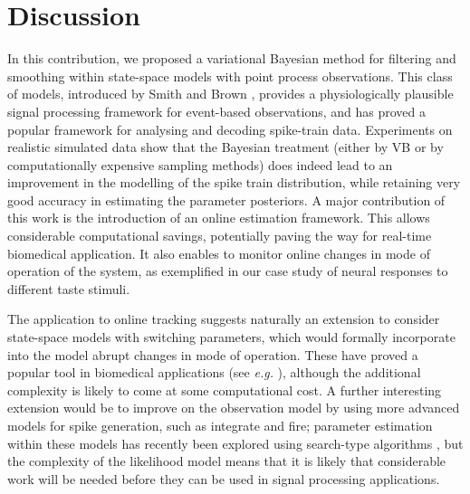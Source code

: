 \documentclass[12pt]{article}
\begin{document}
\section{Discussion}

In this contribution, we proposed a variational Bayesian method for filtering and smoothing within
state-space models with point process observations. This class of models, introduced by Smith and
Brown \cite{Smith_2003}, provides a physiologically plausible signal processing framework for
event-based observations, and has proved a popular framework for analysing and decoding spike-train
data. Experiments on realistic simulated data show that the Bayesian treatment (either by VB or by
computationally expensive sampling methods) does indeed lead to an improvement in the modelling of
the spike train distribution, while retaining very good accuracy in estimating the parameter
posteriors. A major contribution of this work is the introduction of an online estimation framework.
This allows considerable computational savings, potentially paving the way for real-time biomedical
application. It also enables to monitor online changes in mode of operation of the system, as
exemplified in our case study of neural responses to different taste stimuli.

The application to online tracking suggests naturally an extension to consider state-space models
with switching parameters, which would formally incorporate into the model abrupt changes in mode of
operation. These have proved a popular tool in biomedical applications (see {\em e.g.}
\cite{Quinn_2008}), although the additional complexity is likely to come at some computational cost.
A further interesting extension would be to improve on the observation model by using more advanced
models for spike generation, such as integrate and fire; parameter estimation within these models
has recently been explored using search-type algorithms \cite{MacGregor_2009}, but the complexity of the likelihood model means
that it is likely that considerable work will be needed before they can be used in signal processing
applications.
\end{document}
